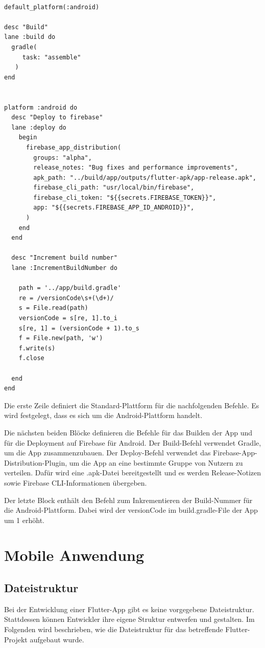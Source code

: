 \begin{lstlisting}[caption=Beispiel zum Einsatz von Fastlane,label=lst:Fastlane]

default_platform(:android)

desc "Build"
lane :build do
  gradle(
     task: "assemble"
   )
end


platform :android do
  desc "Deploy to firebase"
  lane :deploy do
    begin
      firebase_app_distribution(
        groups: "alpha",
        release_notes: "Bug fixes and performance improvements",
        apk_path: "../build/app/outputs/flutter-apk/app-release.apk",
        firebase_cli_path: "usr/local/bin/firebase",
        firebase_cli_token: "${{secrets.FIREBASE_TOKEN}}",
        app: "${{secrets.FIREBASE_APP_ID_ANDROID}}",
      )
    end
  end

  desc "Increment build number"
  lane :IncrementBuildNumber do

    path = '../app/build.gradle'
    re = /versionCode\s+(\d+)/
    s = File.read(path)
    versionCode = s[re, 1].to_i
    s[re, 1] = (versionCode + 1).to_s
    f = File.new(path, 'w')
    f.write(s)
    f.close

  end
end

\end{lstlisting}

Die erste Zeile definiert die Standard-Plattform für die nachfolgenden Befehle. Es wird festgelegt, dass es sich um die Android-Plattform handelt.

Die nächsten beiden Blöcke definieren die Befehle für das Builden der App und für die Deployment auf Firebase für Android. Der Build-Befehl verwendet Gradle, um die App zusammenzubauen. Der Deploy-Befehl verwendet das Firebase-App-Distribution-Plugin, um die App an eine bestimmte Gruppe von Nutzern zu verteilen. Dafür wird eine .apk-Datei bereitgestellt und es werden Release-Notizen sowie Firebase CLI-Informationen übergeben.

Der letzte Block enthält den Befehl zum Inkrementieren der Build-Nummer für die Android-Plattform. Dabei wird der versionCode im build.gradle-File der App um 1 erhöht.


\section{Mobile Anwendung}
\subsection{Dateistruktur}
Bei der Entwicklung einer Flutter-App gibt es keine vorgegebene Dateistruktur. Stattdessen können Entwickler ihre eigene Struktur entwerfen und gestalten. Im Folgenden wird beschrieben, wie die Dateistruktur für das betreffende Flutter-Projekt aufgebaut wurde.

